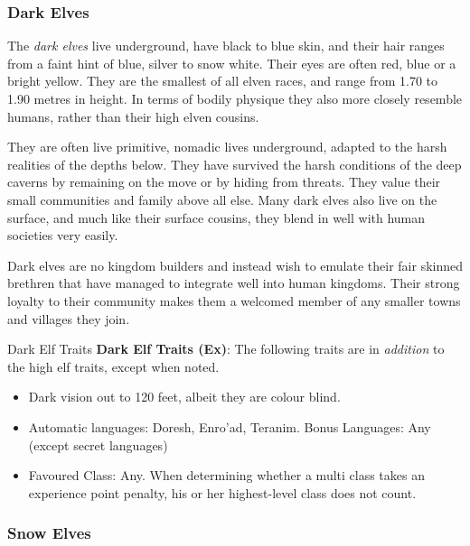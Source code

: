\subsubsection*{Dark Elves}
\label{sec:Dark Elves}

The \emph{dark elves} live underground, have black to blue skin, and their
hair ranges from a faint hint of blue, silver to snow white. Their eyes are
often red, blue or a bright yellow. They are the smallest of all elven races,
and range from 1.70 to 1.90 metres in height. In terms of bodily physique
they also more closely resemble humans, rather than their high elven cousins.

They are often live primitive, nomadic lives underground, adapted to the harsh
realities of the depths below. They have survived the harsh conditions of the
deep caverns by remaining on the move or by hiding from threats. They value
their small communities and family above all else. Many dark elves also live
on the surface, and much like their surface cousins, they blend in well with
human societies very easily.

Dark elves are no kingdom builders and instead wish to emulate their fair
skinned brethren that have managed to integrate well into human kingdoms. Their
strong loyalty to their community makes them a welcomed member of any smaller
towns and villages they join.

\begin{35e}{Dark Elf Traits}
  \textbf{Dark Elf Traits (Ex)}: The following traits are in \emph{addition}
  to the high elf traits, except when noted.
  \begin{itemize}[noitemsep]
    \item Dark vision out to 120 feet, albeit they are colour blind.
    \item Automatic languages: Doresh, Enro'ad, Teranim. Bonus Languages: Any
      (except secret languages)
    \item Favoured Class: Any. When determining whether a multi class takes an
    experience point penalty, his or her highest-level class does not count.
  \end{itemize}
\end{35e}

\subsubsection*{Snow Elves}
\label{sec:Snow Elves}


